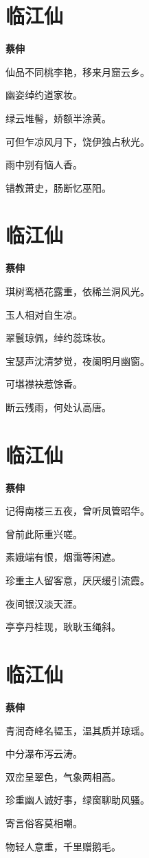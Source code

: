 \documentclass[12pt,a4paper]{ctexbook}
\begin{document}
\section{临江仙}
\textbf{蔡伸}\par\vspace{0.5em}
仙品不同桃李艳，移来月窟云乡。\par
幽姿绰约道家妆。\par
绿云堆髻，娇额半涂黄。\par
可但乍凉风月下，饶伊独占秋光。\par
雨中别有恼人香。\par
错教萧史，肠断忆巫阳。\par

\section{临江仙}
\textbf{蔡伸}\par\vspace{0.5em}
琪树鸾栖花露重，依稀兰洞风光。\par
玉人相对自生凉。\par
翠鬟琼佩，绰约蕊珠妆。\par
宝瑟声沈清梦觉，夜阑明月幽窗。\par
可堪襟袂惹馀香。\par
断云残雨，何处认高唐。\par

\section{临江仙}
\textbf{蔡伸}\par\vspace{0.5em}
记得南楼三五夜，曾听凤管昭华。\par
曾前此际重兴嗟。\par
素娥端有恨，烟霭等闲遮。\par
珍重主人留客意，厌厌缓引流霞。\par
夜间银汉淡天涯。\par
亭亭丹桂现，耿耿玉绳斜。\par

\section{临江仙}
\textbf{蔡伸}\par\vspace{0.5em}
青润奇峰名韫玉，温其质并琼瑶。\par
中分瀑布泻云涛。\par
双峦呈翠色，气象两相高。\par
珍重幽人诚好事，绿窗聊助风骚。\par
寄言俗客莫相嘲。\par
物轻人意重，千里赠鹅毛。\par
\end{document}

